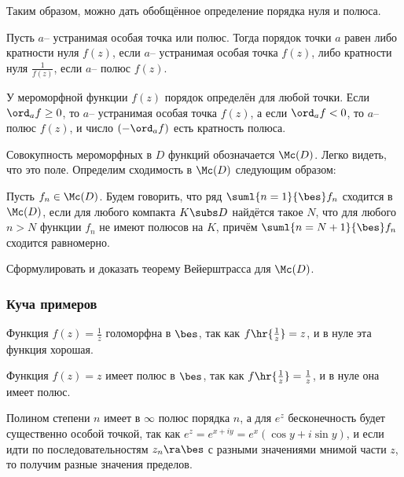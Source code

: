 \documentclass[a4paper]{article}
\begin{document}
Таким образом, можно дать обобщённое определение порядка нуля и полюса.

\begin{df}
Пусть $a$-- устранимая особая точка или полюс. Тогда порядок точки $a$ равен либо кратности нуля $f(z)$,
если $a$-- устранимая особая точка $f(z)$, либо кратности нуля $\frac{1}{f(z)}$, если $a$-- полюс $f(z)$.
\end{df}

У мероморфной функции $f(z)$ порядок определён для любой точки. Если $\ord_a f\ge 0$, то $a$--
устранимая особая точка $f(z)$, а если  $\ord_a f < 0$, то $a$-- полюс $f(z)$, и число $(-\ord_a f)$
есть кратность полюса.

Совокупность мероморфных в $D$ функций обозначается $\Mc(D)$. Легко видеть, что это поле.
Определим сходимость в $\Mc(D)$ следующим образом:

\begin{df}
Пусть $f_n\in \Mc(D)$. Будем говорить, что ряд $\suml{n=1}{\bes}f_n$ сходится в $\Mc(D)$, если для любого компакта
$K \subs D$ найдётся такое $N$, что для любого $n>N$ функции $f_n$ не имеют полюсов на $K$, причём
$\suml{n=N+1}{\bes}f_n$ сходится равномерно.
\end{df}

\begin{problem}
Сформулировать и доказать теорему Вейерштрасса для $\Mc(D)$.
\end{problem}

\subsubsection{Куча примеров}

\begin{ex}
Функция $f(z)=\frac1z$ голоморфна в $\bes$, так как $f\hr{\frac1z}=z$, и в нуле эта функция хорошая.
\end{ex}

\begin{ex}
Функция $f(z)=z$ имеет полюс в $\bes$, так как $f\hr{\frac1z}=\frac1z$, и в нуле она имеет полюс.
\end{ex}

\begin{ex}
Полином степени $n$ имеет в $\infty$ полюс порядка $n$, а для $e^z$ бесконечность будет существенно особой
точкой, так как $e^z = e^{x+iy} = e^x(\cos y + i \sin y)$, и если идти по последовательностям $z_n\ra\bes$
с разными значениями мнимой части $z$, то получим разные значения пределов.
\end{ex}
\end{document}
